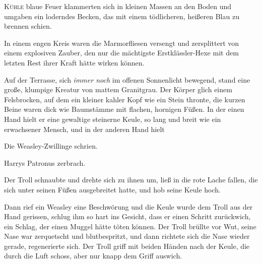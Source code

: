 
\lettrine{K}{ühle} blaue Feuer klammerten sich in kleinen Massen an den Boden und umgaben ein loderndes Becken, das mit einem tödlicheren, heißeren Blau zu brennen schien.

In einem engen Kreis waren die Marmorfliesen versengt und zersplittert von einem explosiven Zauber, den nur die mächtigste Erstklässler-Hexe mit dem letzten Rest ihrer Kraft hätte wirken können.

Auf der Terrasse, sich \emph{immer noch} im offenen Sonnenlicht bewegend, stand eine große, klumpige Kreatur von mattem Granitgrau. Der Körper glich einem Felsbrocken, auf dem ein kleiner kahler Kopf wie ein Stein thronte, die kurzen Beine waren dick wie Baumstämme mit flachen, hornigen Füßen. In der einen Hand hielt er eine gewaltige steinerne Keule, so lang und breit wie ein erwachsener Mensch, und in der anderen Hand hielt 

Die Weasley-Zwillinge schrien.

Harrys Patronus zerbrach.

Der Troll schnaubte und drehte sich zu ihnen um, ließ  in die rote Lache fallen, die sich unter seinen Füßen ausgebreitet hatte, und hob seine Keule hoch.

Dann rief ein Weasley eine Beschwörung und die Keule wurde dem Troll aus der Hand gerissen, schlug ihm so hart ins Gesicht, dass er einen Schritt zurückwich, ein Schlag, der einen Muggel hätte töten können. Der Troll brüllte vor Wut, seine Nase war zerquetscht und blutbespritzt, und dann richtete sich die Nase wieder gerade, regenerierte sich. Der Troll griff mit beiden Händen nach der Keule, die durch die Luft schoss, aber nur knapp dem Griff auswich.

